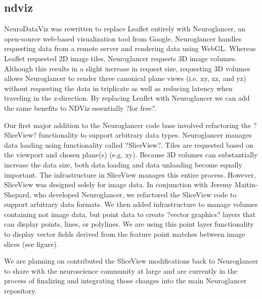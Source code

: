 \documentclass[simplex.tex]{subfiles}
\begin{document}
\subsection[ndviz]{ndviz}

NeuroDataViz was rewritten to replace Leaflet entirely with Neuroglancer, an open-source web-based visualization tool from Google. Neuroglancer handles requesting data from a remote server and rendering data using WebGL. Whereas Leaflet requested 2D image tiles, Neuroglancer requests 3D image volumes. Although this results in a slight increase in request size, requesting 3D volumes allows Neuroglancer to render three canonical plane views (i.e. xy, xz, and yz) without requesting the data in triplicate as well as reducing latency when traveling in the z-direction. By replacing Leaflet with Neuroglancer we can add the same benefits to NDViz essentially ?for free?. 

Our first major addition to the Neuroglancer code base involved refactoring the ?SliceView? functionality to support arbitrary data types. Neuroglancer manages data loading using functionality called ?SliceView?. Tiles are requested based on the viewport and chosen plane(s) (e.g. xy). Because 3D volumes can substantially increase the data size, both data loading and data unloading become equally important. The infrastructure in SliceView manages this entire process. However, SliceView was designed solely for image data. In conjunction with Jeremy Maitin-Shepard, who developed Neuroglancer, we refactored the SliceView code to support arbitrary data formats. We then added infrastructure to manage volumes containing not image data, but point data to create ?vector graphics? layers that can display points, lines, or polylines. We are using this point layer functionality to display vector fields derived from the feature point matches between image slices (see figure). 

We are planning on contributed the SliceView modifications back to Neuroglancer to share with the neuroscience community at large and are currently in the process of finalizing and integrating those changes into the main Neuroglancer repository. 
\end{document}
